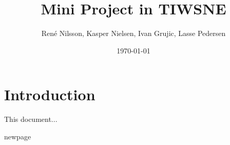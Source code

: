 \documentclass[]{report}
\begin{document}
\title{Mini Project in TIWSNE}
\author{Ren\'e Nilsson, Kasper Nielsen, Ivan Grujic, Lasse Pedersen}
\date{\today}
\maketitle
{}

\chapter{Introduction}
This document...


\newpage
newpage
\end{document}
